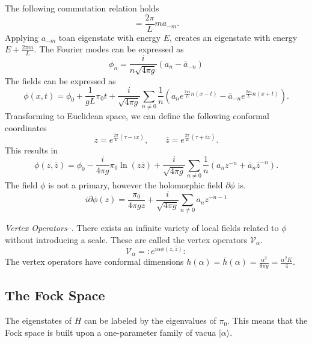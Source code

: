 \documentclass[submission, PhysLectNotes]{SciPost}
\begin{document}
The following commutation relation holds
\begin{equation}
  [H,a_{-m}] = \frac{2\pi}{L}ma_{-m}.
\end{equation}
Applying $a_{-m}$ toan eigenstate with energy $E$, creates an eigenstate with energy $E+\frac{2\pi m}{L}$.
The Fourier modes can be expressed as
\begin{equation}
  \phi_n = \frac{i}{n\sqrt{4\pi g}}(a_n-\overline{a}_{-n})
\end{equation}
The fields can be expressed as
\begin{equation}
  \phi(x,t) = \phi_0 + \frac{1}{gL}\pi_0t + \frac{i}{\sqrt{4\pi g}}\sum_{n \neq 0}\frac{1}{n}\left(a_n e^{\frac{2\pi i}{L} n(x-t)}-\overline{a}_{-n}e^{\frac{2\pi i}{L} n(x+t)}\right).
\end{equation}
Transforming to Euclidean space, we can define the following conformal coordinates
\begin{equation}
  z = e^{\frac{2\pi}{L}(\tau-ix)}, \qquad \overline{z} = e^{\frac{2\pi}{L}(\tau+ix)}.
\end{equation}
This results in
\begin{equation}
  \phi(z,\overline{z}) = \phi_0 - \frac{i}{4\pi g}\pi_0\ln(z\overline{z}) + \frac{i}{\sqrt{4\pi g}}\sum_{n \neq 0}\frac{1}{n}\left(a_n z^{-n}+\overline{a}_{n}\overline{z}^{-n}\right).
\end{equation}
The field $\phi$ is not a primary, however the holomorphic field $\partial \phi$ is.
\begin{equation}
  i \partial \phi(z)  = \frac{\pi_0}{4\pi g z}+\frac{i}{\sqrt{4\pi g}}\sum_{n \neq 0} a_n z^{-n-1}
\end{equation}

\textit{Vertex Operators}--.
There exists an infinite variety of local fields related to $\phi$ without introducing a scale. These are called the vertex operators $\mathcal{V}_\alpha$.
\begin{equation}
  \mathcal{V}_\alpha = :e^{i\alpha\phi(z,\overline{z})}:
\end{equation}
The vertex operators have conformal dimensions $h(\alpha)=\overline{h}(\alpha) = \frac{\alpha^2}{8\pi g} = \frac{\alpha^2 K}{4}$.

\subsection{The Fock Space}
The eigenstates of $H$ can be labeled by the eigenvalues of $\pi_0$. This means that the Fock space is built upon a one-parameter family of vacua $\lvert{\alpha}\rangle$.
\end{document}
